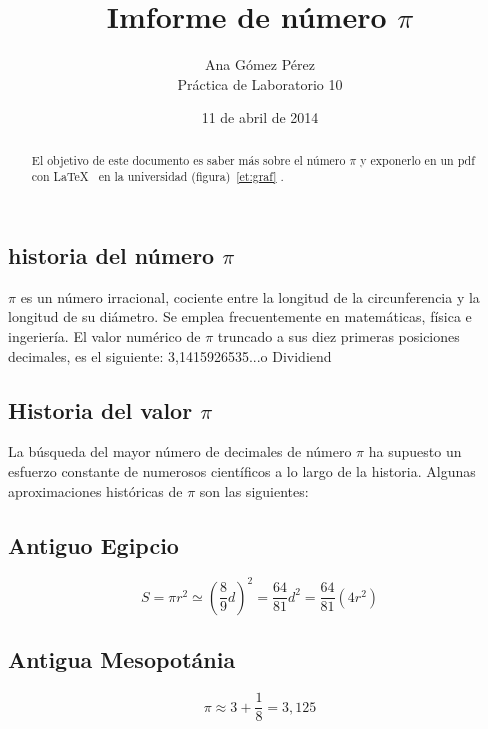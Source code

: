 \documentclass{beamer}
\begin{document}
\begin{frame}
\title[Presentación]{Imforme de número $\pi$}
\author{Ana Gómez Pérez\\ Práctica de Laboratorio 10}
\date{11 de abril de 2014}


\begin{abstract}
El objetivo de este documento es saber más sobre el número $\pi$ y exponerlo en un pdf con \LaTeX{}~\cite{LaTeXpg} en la universidad (figura)~\ref{et:graf} .
\end{abstract}
\end{frame}

\begin{frame}
\section{historia del número $\pi$}
$\pi$ es un número irracional, cociente entre la longitud de la circunferencia y la longitud
de su diámetro. Se emplea frecuentemente en matemáticas, física e ingeriería. El valor numérico
de $\pi$ truncado a sus diez primeras posiciones decimales, es el siguiente: 3,1415926535...o
Dividiend
\end{frame}

\begin{frame}
\section{Historia del valor $\pi$}
La búsqueda del mayor número de decimales de número $\pi$ ha supuesto un esfuerzo constante de numerosos científicos a lo largo de la historia.
Algunas aproximaciones históricas de $\pi$ son las siguientes:
 \subsection{Antiguo Egipcio}
 \[S=\pi r^2 \simeq (\frac{8}{9}d)^2 = \frac{64}{81}d^2 = \frac{64}{81}(4r^2)\]
 \subsection{Antigua Mesopotánia}
 \[ \pi \approx 3+\frac{1}{8}=3,125\]


\end{frame}


\end{document}
